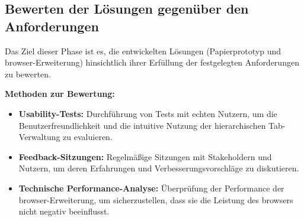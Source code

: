 \subsection{Bewerten der Lösungen gegenüber den Anforderungen}

Das Ziel dieser Phase ist es, die entwickelten Lösungen (Papierprototyp und \gls{browser}-Erweiterung) hinsichtlich ihrer Erfüllung der festgelegten Anforderungen zu bewerten. 

\textbf{Methoden zur Bewertung:}
\begin{itemize}
    \item \textbf{Usability-Tests:} Durchführung von Tests mit echten Nutzern, um die Benutzerfreundlichkeit und die intuitive Nutzung der hierarchischen Tab-Verwaltung zu evaluieren.
    \item \textbf{Feedback-Sitzungen:} Regelmäßige Sitzungen mit Stakeholdern und Nutzern, um deren Erfahrungen und Verbesserungsvorschläge zu diskutieren.
    \item \textbf{Technische Performance-Analyse:} Überprüfung der Performance der \gls{browser}-Erweiterung, um sicherzustellen, dass sie die Leistung des \gls{browser}s nicht negativ beeinflusst.
\end{itemize}

